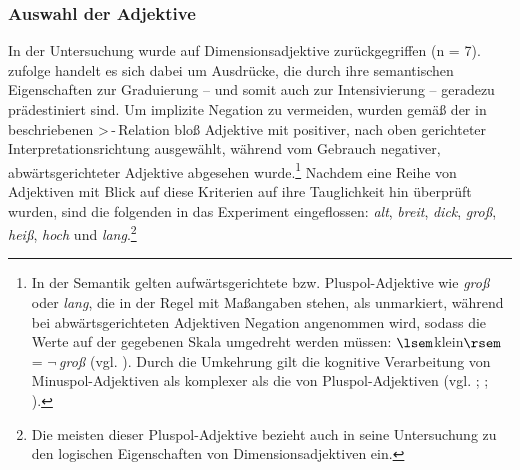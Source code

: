 \subsubsection{Auswahl der Adjektive}
In der Untersuchung wurde auf Dimensionsadjektive zurückgegriffen {(n = 7)}. \citet[471]{Wurzel.1987} zufolge handelt es sich dabei um Ausdrücke, die durch ihre semantischen Eigenschaften zur Graduierung -- und somit auch zur Intensivierung -- geradezu prädestiniert sind. Um implizite Negation zu vermeiden, wurden gemäß der in \citet[59]{Os.1989} beschriebenen \glqq{}>\,-\,Relation\grqq{} bloß Adjektive mit positiver, nach oben gerichteter Interpretationsrichtung ausgewählt, während vom Gebrauch negativer, abwärtsgerichteter Adjektive abgesehen wurde.\footnote{In der Semantik gelten aufwärtsgerichtete bzw. Pluspol-Adjektive wie \textit{groß} oder \textit{lang}, die in der Regel mit Maßangaben stehen, als unmarkiert, während bei abwärtsgerichteten Adjektiven Negation angenommen wird, sodass die Werte auf der gegebenen Skala umgedreht werden müssen: $\lsem$klein$\rsem$ = $\neg$\,\textit{groß} (vgl. {\citealt[107]{Bierwisch.1987b}}). Durch die Umkehrung gilt die kognitive Verarbeitung von Minuspol-Adjektiven als komplexer als die von Pluspol-Adjektiven (vgl. {\citealt[502]{Wurzel.1987}}; \citealt[602]{Blutner.1987}; {\citealt[678]{Bierwisch.1987c}}).} Nachdem eine Reihe von Adjektiven mit Blick auf diese Kriterien auf ihre Tauglichkeit hin überprüft wurden, sind die folgenden in das Experiment eingeflossen: \textit{alt}, \textit{breit}, \textit{dick}, \textit{groß}, \textit{heiß}, \textit{hoch} und \textit{lang}.\footnote{Die meisten dieser Pluspol-Adjektive bezieht auch \citet[519]{Doelling.1987} in seine Untersuchung zu den logischen Eigenschaften von Dimensionsadjektiven ein.}




